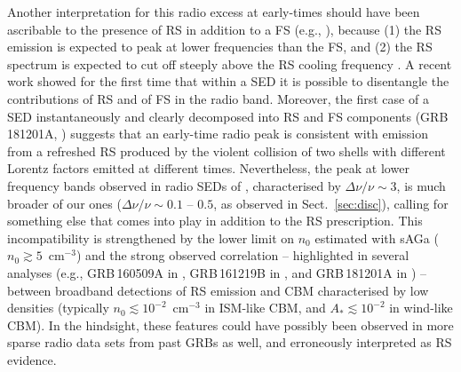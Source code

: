 \documentclass{aa}
\begin{document}
Another interpretation for this radio excess at early-times should have been ascribable to the presence of RS in addition to a FS (e.g., \citealt{Gomboc08,Melandri10,Japelj14,Alexander17,Laskar18}), because (1) the RS emission is expected to peak at lower frequencies than the FS, and (2) the RS spectrum is expected to cut off steeply above the RS cooling frequency \citep{Kobayashi00b}.
A recent work \citep{Laskar19b} showed for the first time that within a SED it is possible to disentangle the contributions of RS and of FS in the radio band.
Moreover, the first case of a SED instantaneously and clearly decomposed into RS and FS components (GRB\,181201A, \citealt{Laskar18c}) suggests that an early-time radio peak is consistent with emission from a refreshed RS produced by the violent collision of two shells with different Lorentz factors emitted at different times.
Nevertheless, the peak at lower frequency bands observed in radio SEDs of \citet{Laskar19b}, characterised by $\Delta \nu / \nu \sim 3$, is much broader of our ones ($\Delta \nu / \nu \sim 0.1$ -- $0.5$, as observed in Sect.~\ref{sec:disc}), calling for something else that comes into play in addition to the RS prescription.
This incompatibility is strengthened by the lower limit on $n_0$ estimated with {\sc sAGa} ($n_0 \gtrsim 5$~cm$^{-3}$) and the strong observed correlation -- highlighted in several analyses (e.g., GRB\,160509A in \citealt{Laskar16}, GRB\,161219B in \citealt{Laskar18}, and GRB\,181201A in \citealt{Laskar19b}) -- between broadband detections of RS emission and CBM characterised by low densities (typically $n_0 \lesssim 10^{-2}$~cm$^{-3}$ in ISM-like CBM, and $A_* \lesssim 10^{-2}$ in wind-like CBM).
In the hindsight, these features could have possibly been observed in more sparse radio data sets from past GRBs as well, and erroneously interpreted as RS evidence.
\end{document}
